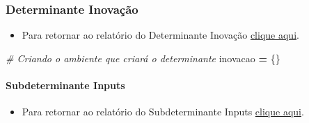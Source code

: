 \documentclass[
  12,
  dvipsnames]{article}
\newenvironment{Shaded}{\begin{snugshade}}{\end{snugshade}}
\newcommand{\CommentTok}[1]{\textcolor[rgb]{0.56,0.35,0.01}{\textit{#1}}}
\newcommand{\NormalTok}[1]{#1}
\newcommand{\OperatorTok}[1]{\textcolor[rgb]{0.81,0.36,0.00}{\textbf{#1}}}
\providecommand{\tightlist}{%
  \setlength{\itemsep}{0pt}\setlength{\parskip}{0pt}}
\begin{document}
\hypertarget{script_2.5}{%
\subsubsection*{Determinante Inovação}\label{script_2.5}}

\begin{itemize}
\tightlist
\item
  Para retornar ao relatório do Determinante Inovação
  \protect\hyperlink{det_inovacao}{clique aqui}.
\end{itemize}

\begin{Shaded}
\begin{Highlighting}[]
\CommentTok{\# Criando o ambiente que criará o determinante}
\NormalTok{inovacao }\OperatorTok{=}\NormalTok{ \{\}}
\end{Highlighting}
\end{Shaded}

\hypertarget{script_2.5.1}{%
\paragraph{Subdeterminante Inputs}\label{script_2.5.1}}

\begin{itemize}
\tightlist
\item
  Para retornar ao relatório do Subdeterminante Inputs
  \protect\hyperlink{subdet_input}{clique aqui}.
\end{itemize}
\end{document}
